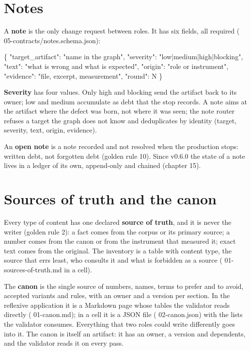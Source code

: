 \documentclass[
  american,
  10pt,
]{report}
\newenvironment{Shaded}{\begin{snugshade}}{\end{snugshade}}
\newcommand{\NormalTok}[1]{#1}
\renewenvironment{Shaded}{%
  \def\FrameCommand{{\color{rulecolor}\vrule width 2pt}\hspace{6pt}\colorbox{shadecolor}}%
  \MakeFramed{\advance\hsize-\width\FrameRestore}\small}%
  {\endMakeFramed}
\renewcommand{\texttt}[1]{{\ttfamily\hyphenchar\font=-1 #1}}
\begin{document}
\section{Notes}\label{notes}

A \textbf{note} is the only change request between roles. It has six
fields, all required
(\texttt{05-\allowbreak{}contracts/\allowbreak{}notes.\allowbreak{}schema.\allowbreak{}json}):

\begin{Shaded}
\begin{Highlighting}[]
\NormalTok{\{ "target\_artifact": "name in the graph", "severity": "low|medium|high|blocking",}
\NormalTok{  "text": "what is wrong and what is expected", "origin": "role or instrument",}
\NormalTok{  "evidence": "file, excerpt, measurement", "round": N \}}
\end{Highlighting}
\end{Shaded}

\textbf{Severity} has four values. Only \texttt{high} and
\texttt{blocking} send the artifact back to its owner; \texttt{low} and
\texttt{medium} accumulate as debt that the stop records. A note aims at
the artifact where the defect was born, not where it was seen; the note
router refuses a target the graph does not know and deduplicates by
identity (target, severity, text, origin, evidence).

An \textbf{open note} is a note recorded and not resolved when the
production stops: written debt, not forgotten debt (golden rule 10).
Since v0.6.0 the state of a note lives in a ledger of its own,
append-only and chained (chapter 15).

\section{Sources of truth and the
canon}\label{sources-of-truth-and-the-canon}

Every type of content has one declared \textbf{source of truth}, and it
is never the writer (golden rule 2): a fact comes from the corpus or its
primary source; a number comes from the canon or from the instrument
that measured it; exact text comes from the original. The inventory is a
table with content type, the source that errs least, who consults it and
what is forbidden as a source
(\texttt{01-\allowbreak{}sources-\allowbreak{}of-\allowbreak{}truth.\allowbreak{}md}
in a cell).

The \textbf{canon} is the single source of numbers, names, terms to
prefer and to avoid, accepted variants and rules, with an owner and a
version per section. In the reflexive application it is a Markdown page
whose tables the validator reads directly
(\texttt{01-\allowbreak{}canon.\allowbreak{}md}); in a cell it is a JSON
file (\texttt{02-\allowbreak{}canon.\allowbreak{}json}) with the lists
the validator consumes. Everything that two roles could write
differently goes into it. The canon is itself an artifact: it has an
owner, a version and dependents, and the validator reads it on every
pass.
\end{document}
